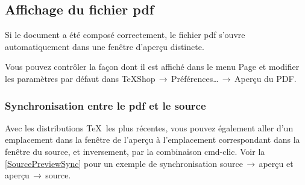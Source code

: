 \documentclass[11pt,french]{article}
\newcommand{\acr}[1]{\textsf{#1}}
\newcommand{\cmd}[1]{\textsf{#1}}
\newcommand{\mnu}[1]{\textsf{#1}}
\newcommand{\To}{\,\(\to\)\,}
\begin{document}
\subsection{Affichage du fichier \acr{pdf}}

Si le document a été composé correctement, le fichier \acr{pdf} s'ouvre automatiquement dans une fenêtre d'aperçu distincte.

Vous pouvez contrôler la façon dont il est affiché dans le menu \mnu{Page} et modifier les paramètres par défaut dans \mnu{TeXShop}\To\mnu{Préférences…}\To\mnu{Aperçu du PDF}.

%

\subsubsection{Synchronisation entre le \acr{pdf} et le source}

Avec les distributions \TeX\ les plus récentes, vous pouvez également aller d'un emplacement dans la fenêtre de l'aperçu à l'emplacement correspondant dans la fenêtre du source, et inversement, par la combinaison \cmd{cmd-clic}. Voir la \vref{SourcePreviewSync} pour un exemple de synchronisation source\To aperçu et aperçu\To source.


\end{document}
